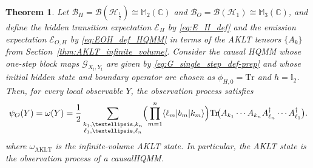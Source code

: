 \documentclass[10pt,a4paper]{amsart}
\newtheorem{theorem}{Theorem}
\def\Tr{\mathrm{Tr}}
\begin{document}
\begin{theorem}\label{thm:AKLT_is_observation_rigorous}
Let \(\mathcal{B}_H=\mathcal{B}(\mathcal{H}_{\frac{1}{2}})\cong\mathbb{M}_2(\mathbb{C})\) and \(\mathcal{B}_O=\mathcal{B}(\mathcal{H}_{1})\cong\mathbb{M}_3(\mathbb{C})\), and define the hidden transition expectation \(\mathcal{E}_H\) by \eqref{eq:E_H_def} and the emission expectation \(\mathcal{E}_{O,H}\) by \eqref{eq:EOH_def_HQMM} in terms of the AKLT tensors \(\{A_k\}\) from Section~\ref{thm:AKLT_infinite_volume}. Consider the causal HQMM whose one-step block maps \(\mathcal{G}_{X_t,Y_t}\) are given by \eqref{eq:G_single_step_def-prep} and whose initial hidden state and boundary operator are chosen as \(\phi_{H,0}=\Tr\) and \(h=\mathbb{I}_2\). Then, for every local observable \(Y\), the observation process satisfies
\begin{equation}\label{eq:omega_AKLT_MPS_factorized}
\psi_{O}(Y)=\omega(Y)
=
\frac{1}{2}\sum_{\substack{k_1,\dots,k_n\\ \ell_1,\dots,\ell_n}}
\Bigl(\prod_{m=1}^{n}\langle \ell_m|b_m|k_m\rangle\Bigr)
\Tr\!\bigl(
 A_{k_1}\cdots A_{k_n}A_{\ell_n}^{\dagger}\cdots A_{\ell_1}^{\dagger}
\bigr).
\end{equation}
where \(\omega_{\mathrm{AKLT}}\) is the infinite-volume AKLT state. In particular, the AKLT state is the observation process of a causalHQMM.
\end{theorem}
\end{document}
